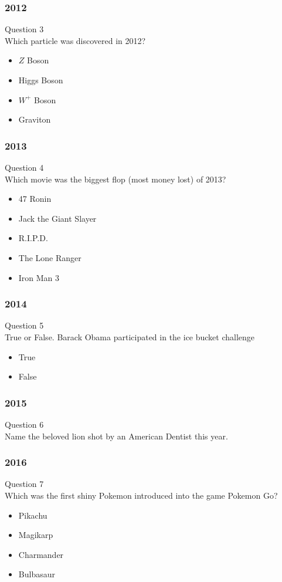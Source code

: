\documentclass{beamer}
\begin{document}
\begin{frame}
\frametitle{2012}
Question 3\\
Which particle was discovered in 2012?
\begin{itemize}

\item $Z$ Boson
\item Higgs Boson
\item $W^+$ Boson
\item Graviton
\end{itemize}
\end{frame}



\begin{frame}
\frametitle{2013}
Question 4\\
Which movie was the biggest flop (most money lost) of 2013?
\begin{itemize}

\item 47 Ronin
\item Jack the Giant Slayer
\item R.I.P.D.
\item The Lone Ranger
\item Iron Man 3
\end{itemize}
\end{frame}

\begin{frame}
\frametitle{2014}
Question 5\\
True or False. Barack Obama participated in the ice bucket challenge
\begin{itemize}

\item True
\item False
\end{itemize}
\end{frame}

\begin{frame}
\frametitle{2015}
Question 6\\
Name the beloved lion shot by an American Dentist this year.
\end{frame}



\begin{frame}
\frametitle{2016}
Question 7\\
Which was the first shiny Pokemon introduced into the game Pokemon Go?

\begin{itemize}
\item Pikachu
\item Magikarp
\item Charmander
\item Bulbasaur
\end{itemize}
\end{frame}
\end{document}
